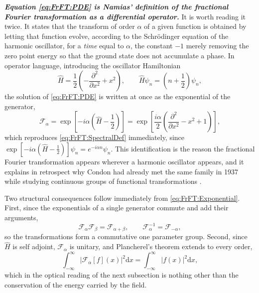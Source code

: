 			\textbf{\textit{Equation \eqref{eq:FrFT:PDE} is Namias' definition of the fractional Fourier transformation as a differential operator.}} It is worth reading it twice. It states that the transform of order $\alpha$ of a given function is obtained by letting that function evolve, according to the Schr\"odinger equation of the harmonic oscillator, for a \textit{time} equal to $\alpha$, the constant $-1$ merely removing the zero point energy so that the ground state does not accumulate a phase. In operator language, introducing the oscillator Hamiltonian
			\begin{equation}\label{eq:FrFT:Hamiltonian}
				\hat{H} = \frac{1}{2}\left(-\frac{\partial^{2}}{\partial x^{2}} + x^{2}\right), \qquad \hat{H}\psi_{n} = \left(n+\frac{1}{2}\right)\psi_{n},
			\end{equation}
			the solution of \eqref{eq:FrFT:PDE} is written at once as the exponential of the generator,
			\begin{equation}\label{eq:FrFT:Exponential}
				\mathcal{F}_{\alpha} = \exp\left[-i\alpha\left(\hat{H}-\frac{1}{2}\right)\right] = \exp\left[\frac{i\alpha}{2}\left(\frac{\partial^{2}}{\partial x^{2}} - x^{2} + 1\right)\right],
			\end{equation}
			which reproduces \eqref{eq:FrFT:SpectralDef} immediately, since $\exp[-i\alpha(\hat{H}-\tfrac{1}{2})]\psi_{n} = e^{-i\alpha n}\psi_{n}$. This identification is the reason the fractional Fourier transformation appears wherever a harmonic oscillator appears, and it explains in retrospect why Condon had already met the same family in 1937 while studying continuous groups of functional transformations \citep{condon1937immersion}.

			Two structural consequences follow immediately from \eqref{eq:FrFT:Exponential}. First, since the exponentials of a single generator commute and add their arguments,
			\begin{equation}\label{eq:FrFT:GroupExp}
				\mathcal{F}_{\alpha}\mathcal{F}_{\beta} = \mathcal{F}_{\alpha+\beta}, \qquad \mathcal{F}_{\alpha}^{-1} = \mathcal{F}_{-\alpha},
			\end{equation}
			so the transformations form a commutative one parameter group. Second, since $\hat{H}$ is self adjoint, $\mathcal{F}_{\alpha}$ is unitary, and Plancherel's theorem extends to every order,
			\begin{equation}\label{eq:FrFT:Plancherel}
				\int_{-\infty}^{\infty}\left|\mathcal{F}_{\alpha}[f](x)\right|^{2}\mathrm{d}x = \int_{-\infty}^{\infty}\left|f(x)\right|^{2}\mathrm{d}x,
			\end{equation}
			which in the optical reading of the next subsection is nothing other than the conservation of the energy carried by the field.

